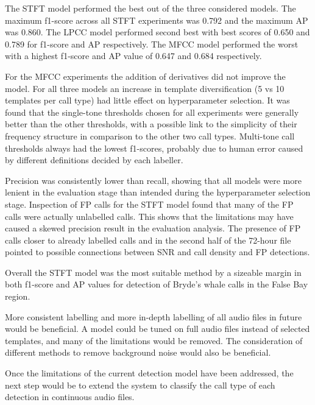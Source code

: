 The \acs{STFT} model performed the best out of the three considered models. The maximum f1-score across all 
\acs{STFT} experiments was 0.792 and the maximum \acs{AP} was 0.860. The \acs{LPCC} model performed second best with best scores of 
0.650 and 0.789 for f1-score and \acs{AP} respectively. The \acs{MFCC} model performed the worst with a highest f1-score and \acs{AP} value of 
0.647 and 0.684 respectively. 

For the \acs{MFCC} experiments the addition of derivatives did not improve the model. For all three models an 
increase in template diversification (5 vs 10 templates per call type) had little effect on hyperparameter selection. 
It was found that the single-tone thresholds chosen for all experiments were generally better than the other 
thresholds, with a possible link to the simplicity of their frequency structure in comparison to the other 
two call types. Multi-tone call thresholds always had the lowest f1-scores, probably due to human error caused 
by different definitions decided by each labeller.

Precision was consistently lower than recall, showing that all models were more lenient in the evaluation 
stage than intended during the hyperparameter selection stage. Inspection of \acs{FP} calls for the \acs{STFT} model 
found that many of the \acs{FP} calls were actually unlabelled calls. This shows that the limitations may have caused 
a skewed precision result in the evaluation analysis. The presence of \acs{FP} calls closer to already labelled calls and in the second 
half of the 72-hour file pointed to possible connections between \acs{SNR} and call density and \acs{FP} detections. 

Overall the \acs{STFT} model was the most suitable method by a sizeable margin in both f1-score and \acs{AP} values for detection of 
Bryde's whale calls in the False Bay region.

\label{sec:fut_work}

More consistent labelling and more in-depth labelling of all audio files in future would be beneficial. A model 
could be tuned on full audio files instead of selected templates, and many of the limitations would be removed. 
The consideration of different methods to remove background noise would also be beneficial.

Once the limitations of the current detection model have been addressed, the next step would be to 
extend the system to classify the call type of each detection in continuous audio files.